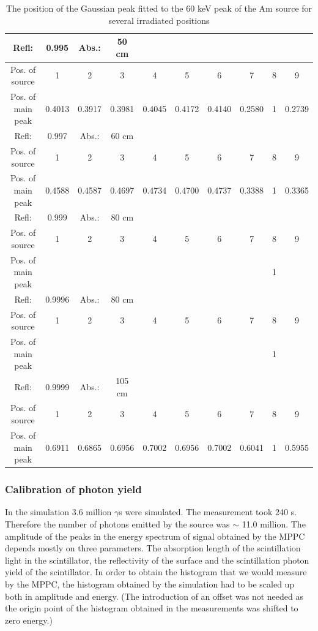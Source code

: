 \documentclass[12pt, a4paper,titlepage]{article}
\numberwithin{equation}{section}
\numberwithin{figure}{section}
\begin{document}

\begin{table}[h!]
\begin{center}
\begin{tabular}{ |c|c|c|c|c|c|c|c|c|c| } 
\hline
Refl:& 0.995 & Abs.:& 50 cm   &  &  &  &  &  &  \\ 
\hline
 Pos. of source & 1 & 2 & 3 & 4 & 5 & 6 & 7 & 8 & 9 \\ 
 Pos. of main peak & 0.4013 & 0.3917 & 0.3981 & 0.4045 & 0.4172 & 0.4140 & 0.2580 & 1 & 0.2739\\ 
 \hline   
\hline
 Refl:& 0.997 & Abs.:& 60 cm   &  &  &  &  &  &  \\ 
 \hline
  Pos. of source & 1 & 2 & 3 & 4 & 5 & 6 & 7 & 8 & 9 \\ 
  Pos. of main peak & 0.4588 & 0.4587 & 0.4697 & 0.4734 & 0.4700 & 0.4737 & 0.3388 & 1 & 0.3365  \\ 
 \hline \hline
Refl:& 0.999 & Abs.:& 80 cm   &  &  &  &  &  &  \\ 
 \hline
  Pos. of source & 1 & 2 & 3 & 4 & 5 & 6 & 7 & 8 & 9 \\ 
  Pos. of main peak &  &  &  &  &  &  &  & 1 &   \\ 
 \hline \hline
Refl:& 0.9996 & Abs.:& 80 cm   &  &  &  &  &  &  \\ 
 \hline
  Pos. of source & 1 & 2 & 3 & 4 & 5 & 6 & 7 & 8 & 9 \\ 
  Pos. of main peak &  &  &  &  &  &  &  & 1 &  \\ 
  \hline \hline
Refl:& 0.9999 & Abs.:& 105 cm   &  &  &  &  &  &  \\ 
 \hline
  Pos. of source & 1 & 2 & 3 & 4 & 5 & 6 & 7 & 8 & 9 \\ 
  Pos. of main peak & 0.6911 & 0.6865 & 0.6956 & 0.7002 & 0.6956 & 0.7002 & 0.6041 & 1 & 0.5955 \\ 
  \hline
\end{tabular}
 \caption{The position of the Gaussian peak fitted to the 60 keV peak of the Am source for several irradiated positions}
 \label{tabl:simulated}
\end{center}
\end{table}

\subsubsection{Calibration of photon yield}

In the simulation 3.6 million $\gamma$s were simulated. The measurement took 240 s. Therefore the number of photons emitted by the source was $\sim$ 11.0 million. The amplitude of the peaks in the energy spectrum of signal obtained by the MPPC depends mostly on three parameters. The absorption length of the scintillation light in the scintillator, the reflectivity of the surface and the scintillation photon yield of the scintillator. In order to obtain the histogram that we would measure by the MPPC, the histogram obtained by the simulation had to be scaled up both in amplitude and energy. (The introduction of an offset was not needed as the origin point of the histogram obtained in the measurements was shifted to zero energy.)
\end{document}
